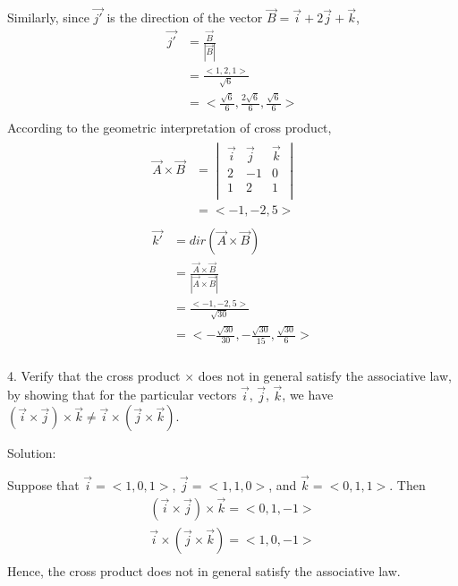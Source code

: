\documentclass{article}
\begin{document}
Similarly, since $\vec{j'}$ is the direction of the vector 
$\vec{B} = \vec{i} + 2\vec{j} + \vec{k}$,
\begin{equation*}
\begin{split}
  \vec{j'} &= \frac{\vec{B}}{|\vec{B}|} \\
           &= \frac{<1, 2, 1>}{\sqrt{6}} \\
           &= <\frac{\sqrt{6}}{6}, \frac{2\sqrt{6}}{6}, \frac{\sqrt{6}}{6}> \\
\end{split}
\end{equation*}
According to the geometric interpretation of cross product,
\begin{gather*}
  \begin{split}
    \vec{A} \times \vec{B}
    &= \begin{vmatrix}
         \vec{i} & \vec{j} & \vec{k} \\
         2 & -1 & 0 \\
         1 & 2 & 1 \\
       \end{vmatrix} \\
    &= <-1, -2, 5>
  \end{split} \\
  \begin{split}
    \vec{k'} &= dir(\vec{A} \times \vec{B}) \\
             &= \frac{\vec{A} \times \vec{B}}{|\vec{A} \times \vec{B}|} \\
             &= \frac{<-1, -2, 5>}{\sqrt{30}} \\
             &= <-\frac{\sqrt{30}}{30}, -\frac{\sqrt{30}}{15}, \frac{\sqrt{30}}{6}> \\
  \end{split}
\end{gather*}

4. Verify that the cross product $\times$ does not in general satisfy the
associative law, by showing that for the particular vectors $\vec{i}$,
$\vec{j}$, $\vec{k}$, we have $(\vec{i} \times \vec{j}) \times \vec{k} \neq
\vec{i} \times (\vec{j} \times \vec{k})$.

Solution:

Suppose that $\vec{i} = <1, 0, 1>$, $\vec{j} = <1, 1, 0>$, and 
$\vec{k} = <0, 1, 1>$.
Then
\begin{gather*}
  (\vec{i} \times \vec{j}) \times \vec{k} = <0, 1, -1> \\
  \vec{i} \times (\vec{j} \times \vec{k}) = <1, 0, -1> \\
\end{gather*}
Hence, the cross product does not in general satisfy the associative law.
\end{document}
